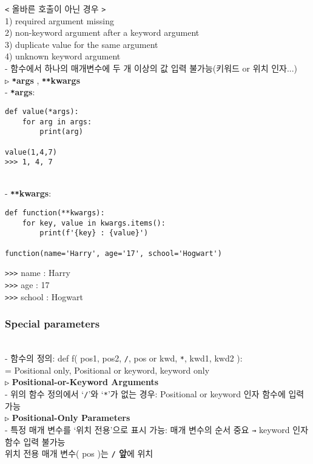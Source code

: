 \documentclass[11pt,a4paper]{article}
\begin{document}
\begin{spacing}{1.5}
\texttt{<}  올바른 호출이 아닌 경우  \texttt{>}\\
1) required argument missing\\
2) non-keyword argument after a keyword argument\\
3) duplicate value for the same argument\\
4) unknown keyword argument\\

- 함수에서 하나의 매개변수에 두 개 이상의 값 입력 불가능(키워드 or 위치 인자...)\\

\texttt{▷}   \textbf{\texttt{*}args} ,    \textbf{\texttt{**}kwargs}\\
-  \textbf{\texttt{*}args}:
\begin{lstlisting}[label={list:first}]
def value(*args):
    for arg in args:
        print(arg)

value(1,4,7)
>>> 1, 4, 7
\end{lstlisting}\\

-  \textbf{\texttt{**}kwargs}:
\begin{lstlisting}[label={list:first}]
def function(**kwargs):
    for key, value in kwargs.items():
        print(f'{key} : {value}')

function(name='Harry', age='17', school='Hogwart')
\end{lstlisting}
\verb|>>>| name : Harry\\
\verb|>>>| age : 17\\
\verb|>>>| school : Hogwart\\


\subsubsection{\Large\textbf{Special parameters}}\\
- 함수의 정의: def  f( pos1, pos2, \texttt{/}, pos or kwd, \texttt{*}, kwd1, kwd2 ):\\
=   Positional only, Positional or keyword, keyword only\\

\texttt{▷} \large\textbf{Positional-or-Keyword Arguments}\\
- 위의 함수 정의에서 `\texttt{/}'와  `\texttt{*}'가 없는 경우: Positional or keyword 인자 함수에 입력 가능\\

\texttt{▷} \large\textbf{Positional-Only Parameters}\\
- 특정 매개 변수를 `위치 전용'으로 표시 가능: 매개 변수의 순서 중요 \texttt{→} keyword 인자 함수 입력 불가능\\
\hspace*{2em}위치 전용 매개 변수( pos )는 \textbf{\texttt{/} 앞}에 위치\\



\end{spacing}
\end{document}
